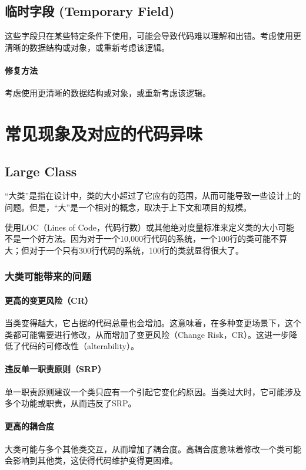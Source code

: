 \subsection{临时字段 (Temporary Field)}这些字段只在某些特定条件下使用，可能会导致代码难以理解和出错。考虑使用更清晰的数据结构或对象，或重新考虑该逻辑。
\paragraph{修复方法}考虑使用更清晰的数据结构或对象，或重新考虑该逻辑。

\section{常见现象及对应的代码异味}
\subsection{Large Class}
“大类”是指在设计中，类的大小超过了它应有的范围，从而可能导致一些设计上的问题。但是，“大”是一个相对的概念，取决于上下文和项目的规模。

使用LOC（Lines of Code，代码行数）或其他绝对度量标准来定义类的大小可能不是一个好方法。因为对于一个10,000行代码的系统，一个100行的类可能不算大；但对于一个只有300行代码的系统，100行的类就显得很大了。

\subsubsection{大类可能带来的问题}

\paragraph{更高的变更风险（CR）}当类变得越大，它占据的代码总量也会增加。这意味着，在多种变更场景下，这个类都可能需要进行修改，从而增加了变更风险（Change Risk，CR）。这进一步降低了代码的可修改性（alterability）。

\paragraph{违反单一职责原则（SRP）}单一职责原则建议一个类只应有一个引起它变化的原因。当类过大时，它可能涉及多个功能或职责，从而违反了SRP。

\paragraph{更高的耦合度}大类可能与多个其他类交互，从而增加了耦合度。高耦合度意味着修改一个类可能会影响到其他类，这使得代码维护变得更困难。

